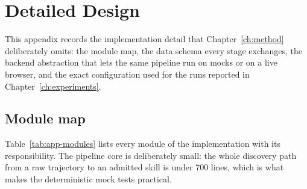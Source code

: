 \chapter{Detailed Design}
\label{app:design}

This appendix records the implementation detail that Chapter~\ref{ch:method}
deliberately omits: the module map, the data schema every stage exchanges,
the backend abstraction that lets the same pipeline run on mocks or on a live
browser, and the exact configuration used for the runs reported in
Chapter~\ref{ch:experiments}.

\section{Module map}
\label{app:design-modules}

Table~\ref{tab:app-modules} lists every module of the implementation with its
responsibility. The pipeline core is deliberately small: the whole discovery
path from a raw trajectory to an admitted skill is under 700 lines, which is
what makes the deterministic mock tests practical.

